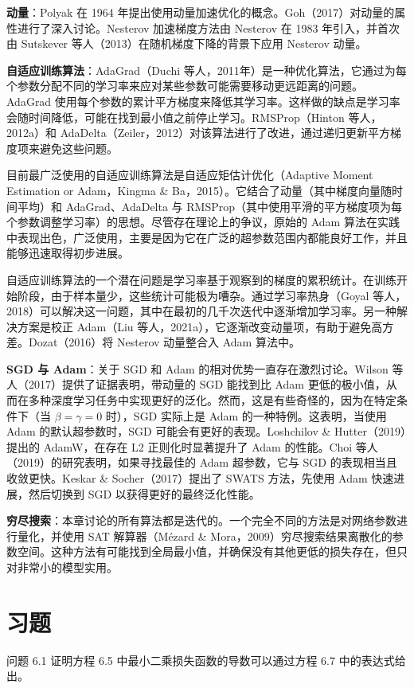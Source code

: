 \documentclass[lang=cn,newtx,10pt,scheme=chinese]{elegantbook}
\begin{document}
\textbf{动量}：Polyak 在 1964 年提出使用动量加速优化的概念。Goh（2017）对动量的属性进行了深入讨论。Nesterov 加速梯度方法由 Nesterov 在 1983 年引入，并首次由 Sutskever 等人（2013）在随机梯度下降的背景下应用 Nesterov 动量。

\textbf{自适应训练算法}：AdaGrad（Duchi 等人，2011年）是一种优化算法，它通过为每个参数分配不同的学习率来应对某些参数可能需要移动更远距离的问题。AdaGrad 使用每个参数的累计平方梯度来降低其学习率。这样做的缺点是学习率会随时间降低，可能在找到最小值之前停止学习。RMSProp（Hinton 等人，2012a）和 AdaDelta（Zeiler，2012）对该算法进行了改进，通过递归更新平方梯度项来避免这些问题。

目前最广泛使用的自适应训练算法是自适应矩估计优化（Adaptive Moment Estimation or Adam，Kingma \& Ba，2015）。它结合了动量（其中梯度向量随时间平均）和 AdaGrad、AdaDelta 与 RMSProp（其中使用平滑的平方梯度项为每个参数调整学习率）的思想。尽管存在理论上的争议，原始的 Adam 算法在实践中表现出色，广泛使用，主要是因为它在广泛的超参数范围内都能良好工作，并且能够迅速取得初步进展。

自适应训练算法的一个潜在问题是学习率基于观察到的梯度的累积统计。在训练开始阶段，由于样本量少，这些统计可能极为嘈杂。通过学习率热身（Goyal 等人，2018）可以解决这一问题，其中在最初的几千次迭代中逐渐增加学习率。另一种解决方案是校正 Adam（Liu 等人，2021a），它逐渐改变动量项，有助于避免高方差。Dozat（2016）将 Nesterov 动量整合入 Adam 算法中。

\textbf{SGD 与 Adam}：关于 SGD 和 Adam 的相对优势一直存在激烈讨论。Wilson 等人（2017）提供了证据表明，带动量的 SGD 能找到比 Adam 更低的极小值，从而在多种深度学习任务中实现更好的泛化。然而，这是有些奇怪的，因为在特定条件下（当 \(\beta = \gamma = 0\) 时），SGD 实际上是 Adam 的一种特例。这表明，当使用 Adam 的默认超参数时，SGD 可能会有更好的表现。Loshchilov \& Hutter（2019）提出的 AdamW，在存在 L2 正则化时显著提升了 Adam 的性能。Choi 等人（2019）的研究表明，如果寻找最佳的 Adam 超参数，它与 SGD 的表现相当且收敛更快。Keskar \& Socher（2017）提出了 SWATS 方法，先使用 Adam 快速进展，然后切换到 SGD 以获得更好的最终泛化性能。

\textbf{穷尽搜索}：本章讨论的所有算法都是迭代的。一个完全不同的方法是对网络参数进行量化，并使用 SAT 解算器（Mézard \& Mora，2009）穷尽搜索结果离散化的参数空间。这种方法有可能找到全局最小值，并确保没有其他更低的损失存在，但只对非常小的模型实用。

\section{习题}
问题 6.1 证明方程 6.5 中最小二乘损失函数的导数可以通过方程 6.7 中的表达式给出。
\end{document}
